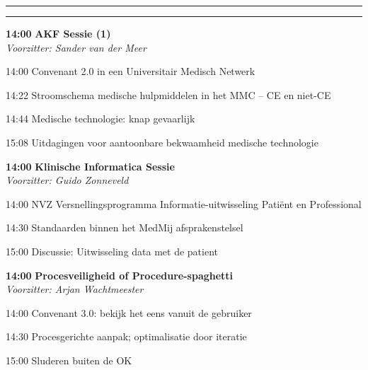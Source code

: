 \documentclass[a4paper,10pt]{report}
\begin{document}
\begin{multicols*}{3}
\vfill\strut

\columnbreak

\hrule \vspace{2mm}
\vspace{2mm}\hrule\strut

\begin{packed_enum}
\item[\textbf{14:00}] \textbf{AKF Sessie (1)}\\\textit{Voorzitter: Sander van der Meer}
\item[14:00] Convenant 2.0 in een Universitair Medisch Netwerk
\item[14:22] Stroomschema medische hulpmiddelen in het MMC -- CE en niet-CE
\item[14:44] Medische technologie: knap gevaarlijk
\item[15:08] Uitdagingen voor aantoonbare bekwaamheid medische technologie
\end{packed_enum} %

\vfill

\begin{packed_enum}
\item[\textbf{14:00}] \textbf{Klinische Informatica Sessie }\\\textit{Voorzitter: Guido Zonneveld}
\item[14:00] NVZ Versnellingsprogramma Informatie-uitwis\-seling Pa\-tiënt en Pro\-fessional 
\item[14:30] Standaarden binnen het MedMij afsprakenstelsel
\item[15:00] Discussie: Uitwisseling data met de patient 
\end{packed_enum} %

\vfill

\begin{packed_enum}
\item[\textbf{14:00}] \textbf{Procesveiligheid of Procedure-spaghetti}\\\textit{Voorzitter: Arjan Wachtmeester}
\item[14:00] Convenant 3.0: bekijk het eens vanuit de gebruiker
\item[14:30] Procesgerichte aanpak; optimalisatie door iteratie
\item[15:00] Sluderen buiten de OK
\end{packed_enum} %


\end{multicols*}
\end{document}
